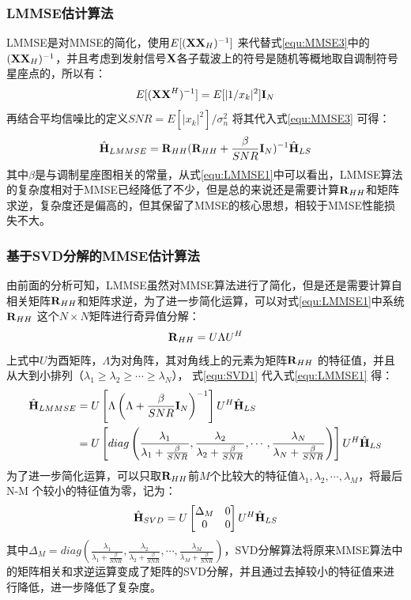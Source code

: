 \subsubsection{LMMSE估计算法}
LMMSE是对MMSE的简化，使用$E[(\textbf X \textbf X_H)^{-1}]$ 来代替式\ref{equ:MMSE3}中的$(\textbf X \textbf X_H)^{-1}$\cite{付可2015lte}，并且考虑到发射信号$\textbf X$各子载波上的符号是随机等概地取自调制符号星座点的，所以有：
\begin{equation}
E[(\textbf X \textbf X^H)^{-1}]=E[|1/x_k|^2]\textbf I_N
\end{equation}
再结合平均信噪比的定义$SNR=E[|x_k|^2]/{\sigma_n^2}$ 将其代入式\ref{equ:MMSE3} 可得：
\begin{equation}
\hat{\textbf H}_{LMMSE}=\textbf R_{HH}(\textbf R_{HH}+\frac{\beta}{SNR}\textbf I_N)^{-1}\hat{\textbf H}_{LS}
\label{equ:LMMSE1}
\end{equation}
其中$\beta$是与调制星座图相关的常量\cite{张乃元2010lte}，从式\ref{equ:LMMSE1}中可以看出，LMMSE算法的复杂度相对于MMSE已经降低了不少，但是总的来说还是需要计算$\textbf R_{HH}$和矩阵求逆，复杂度还是偏高的，但其保留了MMSE的核心思想，相较于MMSE性能损失不大。
\subsubsection{基于SVD分解的MMSE估计算法}
由前面的分析可知，LMMSE虽然对MMSE算法进行了简化，但是还是需要计算自相关矩阵$\textbf R_{HH}$和矩阵求逆，为了进一步简化运算，可以对式\ref{equ:LMMSE1}中系统$\textbf R_{HH}$ 这个$N\times N$矩阵进行奇异值分解：
\begin{equation}
\textbf R_{HH} = U \Lambda U^H
\label{equ:SVD1}
\end{equation}
上式中$U$为酉矩阵，$\Lambda$为对角阵，其对角线上的元素为矩阵$\textbf R_{HH}$ 的特征值，并且从大到小排列（$\lambda_1\geq\lambda_2\geq\cdots\geq\lambda_N$）， 式\ref{equ:SVD1} 代入式\ref{equ:LMMSE1} 得：
\begin{equation}
\begin{aligned}
\hat{\textbf H}_{LMMSE}&=U\left[\Lambda\left(\Lambda+\frac{\beta}{SNR}\textbf I_N\right)^{-1}\right]U^H\hat{\textbf H}_{LS} \\
&=U\left[diag\left(\frac{\lambda_1}{\lambda_1+\frac{\beta}{SNR}},\frac{\lambda_2}{\lambda_2+\frac{\beta}{SNR}},\cdots,\frac{\lambda_N}{\lambda_N+\frac{\beta}{SNR}}\right)\right]U^H\hat{\textbf H}_{LS}
\end{aligned}
\end{equation}
为了进一步简化运算，可以只取$\textbf R_{HH}$前$M$个比较大的特征值$\lambda_1,\lambda_2,\cdots,\lambda_M$，将最后N-M 个较小的特征值为零，记为：
\begin{equation}
\hat{\textbf H}_{SVD}=U \begin{bmatrix}\Delta_M & 0 \\ 0 & 0 \end{bmatrix} U^H \hat{\textbf H}_{LS}
\end{equation}
其中$\Delta_M = diag\left(\frac{\lambda_1}{\lambda_1+\frac{\beta}{SNR}},\frac{\lambda_2}{\lambda_2+\frac{\beta}{SNR}},\cdots,\frac{\lambda_M}{\lambda_M+\frac{\beta}{SNR}}\right)$，SVD分解算法将原来MMSE算法中的矩阵相关和求逆运算变成了矩阵的SVD分解，并且通过去掉较小的特征值来进行降低，进一步降低了复杂度。
